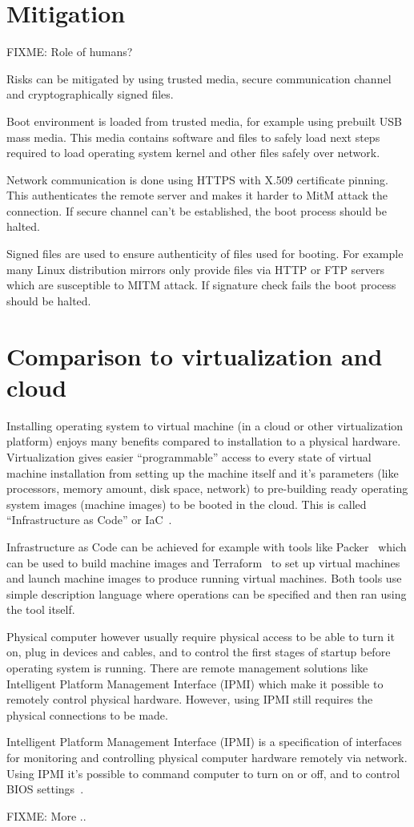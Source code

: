 \section{Mitigation}

FIXME: Role of humans?

Risks can be mitigated by using trusted media, secure communication
channel and cryptographically signed files.

Boot environment is loaded from trusted media, for example using
prebuilt USB mass media. This media contains software and files to
safely load next steps required to load operating system kernel and
other files safely over network.

Network communication is done using HTTPS with X.509 certificate
pinning. This authenticates the remote server and makes it harder to
MitM attack the connection. If secure channel can't be established,
the boot process should be halted.

Signed files are used to ensure authenticity of files used for
booting. For example many Linux distribution mirrors only provide
files via HTTP or FTP servers which are susceptible to MITM attack. If
signature check fails the boot process should be halted.


\section{Comparison to virtualization and cloud}

Installing operating system to virtual machine (in a cloud or other
virtualization platform) enjoys many benefits compared to installation
to a physical hardware. Virtualization gives easier ``programmable''
access to every state of virtual machine installation from setting up
the machine itself and it's parameters (like processors, memory
amount, disk space, network) to pre-building ready operating system
images (machine images) to be booted in the cloud. This is called
``Infrastructure as Code'' or IaC~\cite{spinellis}.

Infrastructure as Code can be achieved for example with tools like
Packer~\cite{packer} which can be used to build machine images and
Terraform~\cite{terraform} to set up virtual machines and launch
machine images to produce running virtual machines. Both tools use
simple description language where operations can be specified and then
ran using the tool itself.

Physical computer however usually require physical access to be able
to turn it on, plug in devices and cables, and to control the first
stages of startup before operating system is running. There are remote
management solutions like Intelligent Platform Management Interface
(IPMI) which make it possible to remotely control physical
hardware. However, using IPMI still requires the physical connections
to be made.

Intelligent Platform Management Interface (IPMI) is a specification of
interfaces for monitoring and controlling physical computer hardware
remotely via network. Using IPMI it's possible to command computer to
turn on or off, and to control BIOS settings~\cite{ipmi-spec}.

FIXME: More ..
